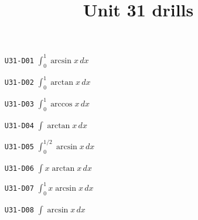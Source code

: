 \title{Unit 31 drills}\maketitle\begin{enumerate}
  \item[\texttt{U31-D01}] $\displaystyle \int_{0}^{1}\arcsin x\,dx$
  \item[\texttt{U31-D02}] $\displaystyle \int_{0}^{1}\arctan x\,dx$
  \item[\texttt{U31-D03}] $\displaystyle \int_{0}^{1}\arccos x\,dx$
  \item[\texttt{U31-D04}] $\displaystyle \int\arctan x\,dx$
  \item[\texttt{U31-D05}] $\displaystyle \int_{0}^{1/2}\arcsin x\,dx$
  \item[\texttt{U31-D06}] $\displaystyle \int x\arctan x\,dx$
  \item[\texttt{U31-D07}] $\displaystyle \int_{0}^{1}x\arcsin x\,dx$
  \item[\texttt{U31-D08}] $\displaystyle \int\arcsin x\,dx$
\end{enumerate}

